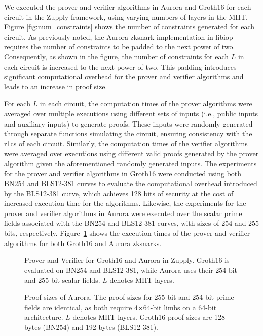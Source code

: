 We executed the prover and verifier algorithms in Aurora and Groth16 for each circuit in the Zupply framework, using varying numbers of layers in the \textsf{MHT}. Figure \ref{fig:num_constraints} shows the number of constraints generated for each circuit. As previously noted, the Aurora \gls{zksnark} implementation in libiop \cite{libiop} requires the number of constraints to be padded to the next power of two. Consequently, as shown in the figure, the number of constraints for each $L$ in each circuit is increased to the next power of two. This padding introduces significant computational overhead for the prover and verifier algorithms and leads to an increase in proof size.


For each $L$ in each circuit, the computation times of the prover algorithms were averaged over multiple executions using different sets of inputs (i.e., public inputs and auxiliary inputs) to generate proofs. These inputs were randomly generated through  separate functions simulating the circuit, ensuring consistency with the \gls{r1cs} of each circuit. Similarly, the computation times of the verifier algorithms were averaged over executions using different valid proofs generated by the prover algorithm given the aforementioned randomly generated inputs. 
The experiments for the prover and verifier algorithms in Groth16 were conducted using both BN254 and BLS12-381 curves to evaluate the computational overhead introduced by the BLS12-381 curve, which achieves 128 bits of security at the cost of increased execution time for the algorithms. Likewise, the experiments for the prover and verifier algorithms in Aurora were executed over the scalar prime fields associated with the BN254 and BLS12-381 curves, with sizes of 254 and 255 bits, respectively. Figure~\ref{fig:execution_time} shows the execution times of the prover and verifier algorithms for both Groth16 and Aurora \gls{zksnark}s.

\begin{figure}
    \centering
    \scalebox{0.81}{
    
    }
    \caption[The runtime of the prover and verifier algorithms in Zupply]{Prover and Verifier for Groth16 and Aurora in Zupply. Groth16 is evaluated on BN254 and BLS12-381, while Aurora uses their 254-bit and 255-bit scalar fields. $L$ denotes \textsf{MHT} layers.}

    \label{fig:execution_time}
\end{figure}

\begin{figure}
    \centering
    \scalebox{0.81}{
    
    }
    \caption[The proof sizes in Zupply based on Aurora]{Proof sizes of Aurora. The proof sizes for 255-bit and 254-bit prime fields are identical, as both require 4×64-bit limbs on a 64-bit architecture. $L$ denotes \textsf{MHT} layers.  Groth16 proof sizes are 128 bytes (BN254) and 192 bytes (BLS12-381). }
    \label{fig:proof_size}
\end{figure}


